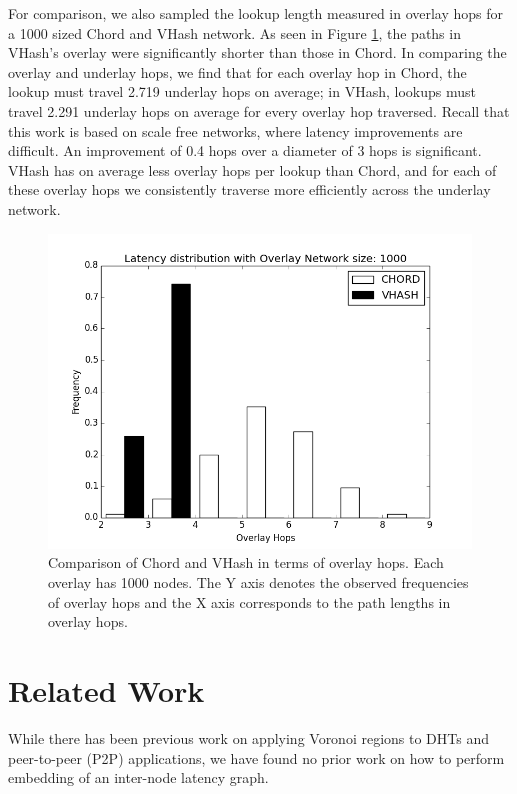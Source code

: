 \documentclass[10pt, conference, letterpaper]{IEEEtran}
\begin{document}
For comparison, we also sampled the lookup length measured in overlay hops for a 1000 sized Chord and VHash network.  As seen in Figure \ref{histover}, the paths in VHash's overlay were significantly shorter than those in Chord. 
In comparing the overlay and underlay hops, we find that for each overlay hop in Chord, the lookup must travel 2.719 underlay hops on average; in VHash, lookups must travel 2.291 underlay hops on average for every overlay hop traversed. 
Recall that this work is based on scale free networks, where latency improvements are difficult.
An improvement of 0.4 hops over a diameter of 3 hops is significant.
VHash has on average less overlay hops per lookup than Chord, and for each of these overlay hops we consistently traverse more efficiently across the underlay network.
\begin{figure}[h]
	\centering
	\includegraphics[width=\linewidth]{hist_overlay_4d}
	\caption{Comparison of Chord and VHash in terms of overlay hops.  Each overlay has 1000 nodes.  The Y axis denotes the observed frequencies of overlay hops and the X axis corresponds to the path lengths in overlay hops.}
	\label{histover}
\end{figure}

\section{Related Work}
\label{related}
While there has been previous work on applying Voronoi regions to DHTs and peer-to-peer (P2P) applications, we have found no prior work on how to perform embedding of an inter-node latency graph.   
\end{document}
